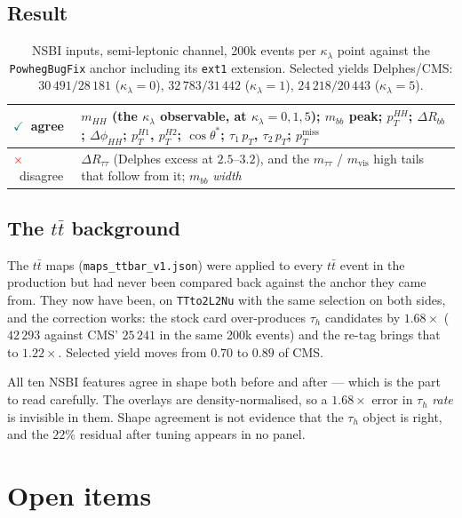 \documentclass[11pt,a4paper]{article}
\newcommand{\tauh}{\tau_{h}}
\newcommand{\mtautau}{m_{\tau\tau}}
\newcommand{\mvis}{m_{\mathrm{vis}}}
\newcommand{\kl}{\kappa_{\lambda}}
\newcommand{\dR}{\Delta R}
\newcommand{\ptmiss}{p_{T}^{\mathrm{miss}}}
\newcommand{\yes}{\textcolor{teal}{$\checkmark$}}
\newcommand{\no}{\textcolor{red}{$\times$}}
\begin{document}
\subsection{Result}

\begin{table}[htbp]
\centering\small
\begin{tabular}{lp{11.3cm}}
\toprule
\yes\ agree & $m_{HH}$ (the $\kl$ observable, at $\kl=0,1,5$); $m_{bb}$ peak;
$p_{T}^{HH}$; $\dR_{bb}$; $\Delta\phi_{HH}$; $p_{T}^{H1}$, $p_{T}^{H2}$;
$\cos\theta^{*}$; $\tau_{1}\,p_{T}$, $\tau_{2}\,p_{T}$; $\ptmiss$ \\
\midrule
\no\ disagree & $\dR_{\tau\tau}$ (Delphes excess at $2.5$--$3.2$), and the $\mtautau$ /
$\mvis$ high tails that follow from it; $m_{bb}$ \emph{width} \\
\bottomrule
\end{tabular}
\caption{NSBI inputs, semi-leptonic channel, 200k events per $\kl$ point against the
\texttt{PowhegBugFix} anchor including its \texttt{ext1} extension. Selected yields
Delphes/CMS: $30\,491/28\,181$ ($\kl=0$), $32\,783/31\,442$ ($\kl=1$), $24\,218/20\,443$
($\kl=5$).\label{tab:features}}
\end{table}

\subsection{The $t\bar t$ background}
\label{sec:ttbar}

The $t\bar t$ maps (\texttt{maps\_ttbar\_v1.json}) were applied to every $t\bar t$ event in
the production but had never been compared back against the anchor they came from. They now
have been, on \texttt{TTto2L2Nu} with the same selection on both sides, and the correction
works: the stock card over-produces $\tauh$ candidates by $1.68\times$ ($42\,293$ against
CMS' $25\,241$ in the same 200k events) and the re-tag brings that to $1.22\times$. Selected
yield moves from $0.70$ to $0.89$ of CMS.

All ten NSBI features agree in shape both before and after --- which is the part to read
carefully. The overlays are density-normalised, so a $1.68\times$ error in $\tauh$
\emph{rate} is invisible in them. Shape agreement is not evidence that the $\tauh$ object is
right, and the $22\%$ residual after tuning appears in no panel.

\section{Open items}
\end{document}

